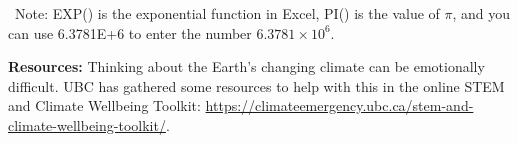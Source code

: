 \documentclass[answers]{exam}
\begin{document}
\begin{questions}
\
Note: EXP() is the exponential function in Excel, PI() is the value of $\pi$, and you can use 6.3781E+6 to enter the number $6.3781 \times 10^6$. 

\end{questions}


\textbf{Resources:} Thinking about the Earth's changing climate can be emotionally difficult. UBC has gathered some resources to help with this in the online STEM and Climate Wellbeing Toolkit: \url{https://climateemergency.ubc.ca/stem-and-climate-wellbeing-toolkit/}.
\end{document}
